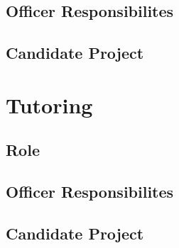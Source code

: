 \documentclass[11pt, article, oneside]{memoir}
\begin{document}
    \subsection{Officer Responsibilites}

    \subsection{Candidate Project}


    \bigbreak

    
    \section{Tutoring}
    \subsection{Role}

    \subsection{Officer Responsibilites}

    \subsection{Candidate Project}

    
    \bigbreak
    


    \newpage
\end{document}
